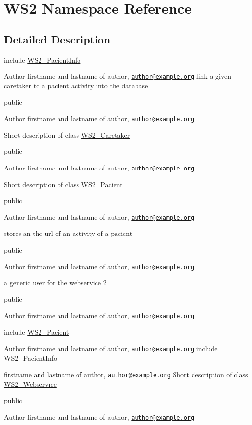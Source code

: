 \hypertarget{namespace_w_s2}{\section{W\+S2 Namespace Reference}
\label{namespace_w_s2}
}


\subsection{Detailed Description}
include \hyperlink{class_w_s2___pacient_info}{W\+S2\+\_\+\+Pacient\+Info}

\begin{DoxyAuthor}{Author}
firstname and lastname of author, \href{mailto:author@example.org}{\tt author@example.\+org} link a given caretaker to a pacient activity into the database
\end{DoxyAuthor}
public \begin{DoxyAuthor}{Author}
firstname and lastname of author, \href{mailto:author@example.org}{\tt author@example.\+org}
\end{DoxyAuthor}
Short description of class \hyperlink{class_w_s2___caretaker}{W\+S2\+\_\+\+Caretaker}

public \begin{DoxyAuthor}{Author}
firstname and lastname of author, \href{mailto:author@example.org}{\tt author@example.\+org}
\end{DoxyAuthor}
Short description of class \hyperlink{class_w_s2___pacient}{W\+S2\+\_\+\+Pacient}

public \begin{DoxyAuthor}{Author}
firstname and lastname of author, \href{mailto:author@example.org}{\tt author@example.\+org}
\end{DoxyAuthor}
stores an the url of an activity of a pacient

public \begin{DoxyAuthor}{Author}
firstname and lastname of author, \href{mailto:author@example.org}{\tt author@example.\+org}
\end{DoxyAuthor}
a generic user for the webservice 2

public \begin{DoxyAuthor}{Author}
firstname and lastname of author, \href{mailto:author@example.org}{\tt author@example.\+org}
\end{DoxyAuthor}
include \hyperlink{class_w_s2___pacient}{W\+S2\+\_\+\+Pacient}

\begin{DoxyAuthor}{Author}
firstname and lastname of author, \href{mailto:author@example.org}{\tt author@example.\+org} include \hyperlink{class_w_s2___pacient_info}{W\+S2\+\_\+\+Pacient\+Info}

firstname and lastname of author, \href{mailto:author@example.org}{\tt author@example.\+org} Short description of class \hyperlink{class_w_s2___webservice}{W\+S2\+\_\+\+Webservice}
\end{DoxyAuthor}
public \begin{DoxyAuthor}{Author}
firstname and lastname of author, \href{mailto:author@example.org}{\tt author@example.\+org} 
\end{DoxyAuthor}
